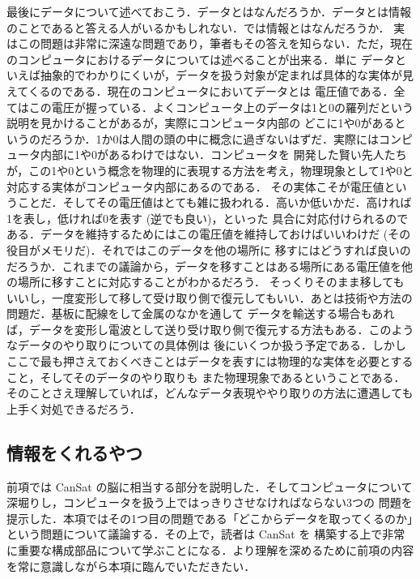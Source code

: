 \documentclass[dvipdfmx]{jsbook}
\begin{document}
  最後にデータについて述べておこう．データとはなんだろうか．データとは情報のことであると答える人がいるかもしれない．では情報とはなんだろうか．
  実はこの問題は非常に深遠な問題であり，筆者もその答えを知らない．ただ，現在のコンピュータにおけるデータについては述べることが出来る．単に
  データといえば抽象的でわかりにくいが，データを扱う対象が定まれば具体的な実体が見えてくるのである．現在のコンピュータにおいてデータとは
  電圧値である．全てはこの電圧が握っている．よくコンピュータ上のデータは1と0の羅列だという説明を見かけることがあるが，実際にコンピュータ内部の
  どこに1や0があるというのだろうか．1か0は人間の頭の中に概念に過ぎないはずだ．実際にはコンピュータ内部に1や0があるわけではない．コンピュータを
  開発した賢い先人たちが，この1や0という概念を物理的に表現する方法を考え，物理現象として1や0と対応する実体がコンピュータ内部にあるのである．
  その実体こそが電圧値ということだ．そしてその電圧値はとても雑に扱われる．高いか低いかだ．高ければ1を表し，低ければ0を表す (逆でも良い)，といった
  具合に対応付けられるのである．データを維持するためにはこの電圧値を維持しておけばいいわけだ (その役目がメモリだ)．それではこのデータを他の場所に
  移すにはどうすれば良いのだろうか．これまでの議論から，データを移すことはある場所にある電圧値を他の場所に移すことに対応することがわかるだろう．
  そっくりそのまま移してもいいし，一度変形して移して受け取り側で復元してもいい．あとは技術や方法の問題だ．基板に配線をして金属のなかを通して
  データを輸送する場合もあれば，データを変形し電波として送り受け取り側で復元する方法もある．このようなデータのやり取りについての具体例は
  後にいくつか扱う予定である．しかしここで最も押さえておくべきことはデータを表すには物理的な実体を必要とすること，そしてそのデータのやり取りも
  また物理現象であるということである．そのことさえ理解していれば，どんなデータ表現ややり取りの方法に遭遇しても上手く対処できるだろう．


\subsection{情報をくれるやつ}
\label{subsub:情報をくれるやつ}

  前項では CanSat の脳に相当する部分を説明した．そしてコンピュータについて深堀りし，コンピュータを扱う上ではっきりさせなければならない3つの
  問題を提示した．本項ではその1つ目の問題である「どこからデータを取ってくるのか」という問題について議論する．その上で，読者は CanSat を
  構築する上で非常に重要な構成部品について学ぶことになる．より理解を深めるために前項の内容を常に意識しながら本項に臨んでいただきたい．
\end{document}
